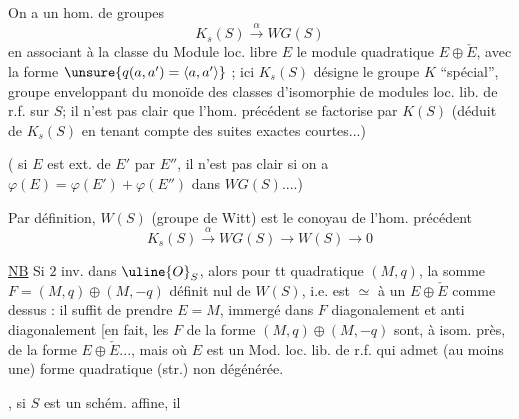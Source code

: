 On a un hom. de groupes
\[
K_s(S)\xrightarrow{\alpha}WG(S)
\]
en associant à la classe du  Module loc. libre $E$ 
le  module quadratique $E\oplus\check E$, avec la forme
$\unsure{q(a,a')=\langle a,a'\rangle}$ ; ici $K_s(S)$ désigne le groupe $K$
``spécial'', groupe enveloppant du monoïde des
classes d'isomorphie de modules loc. lib. de r.f. sur $S$;
il n'est pas clair que l'hom. précédent se factorise
par $K(S)$ (déduit de $K_s(S)$ en tenant compte des
suites exactes courtes...)

( si $E$ est ext.  de $E'$ par $E''$, il n'est pas clair
si on a $\varphi(E)=\varphi(E')+\varphi(E'')$ dans $WG(S)$....)

Par définition, $W(S)$ (groupe de Witt) est le conoyau
de l'hom. précédent
\[
K_s(S)\xrightarrow{\alpha}WG(S)\longrightarrow W(S)\longrightarrow0
\]

\uline{NB} Si $2$ inv. dans $\uline{O}_S$, alors pour tt  quadratique
$(M,q)$, la somme $F=(M,q)\oplus(M,-q)$ définit  
nul de $W(S)$, i.e. est $\simeq$ à un $E\oplus\check E$ comme
dessus : il suffit de prendre $E=M$, immergé
dans $F$ diagonalement et anti diagonalement
[en fait, les  $F$ de la forme $(M,q)\oplus(M,-q)$ sont,
à isom. près,  de la forme $E\oplus\check E$...,
mais où $E$ est un Mod. loc. lib. de r.f.
qui admet (au moins une) forme quadratique
(str.) non dégénérée.

, si $S$ est un schém. affine, il

